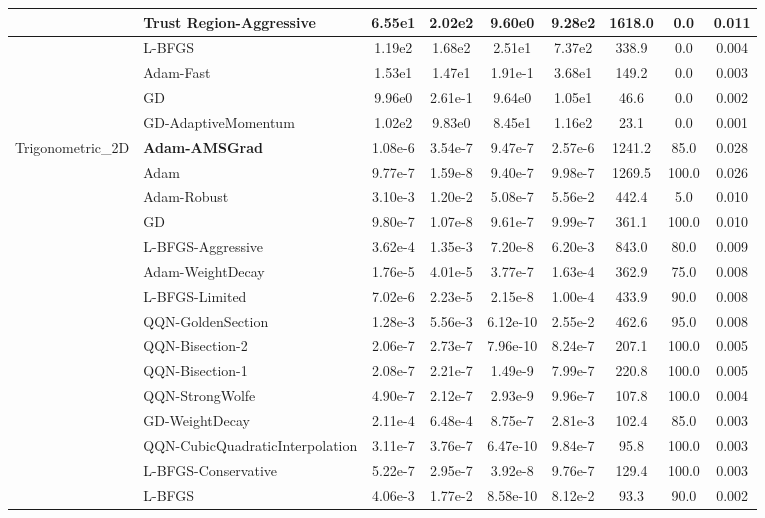 \documentclass[10pt]{article}
\begin{document}
\begin{longtable}{|l|l|c|c|c|c|c|c|c|}
\hline
 & Trust Region-Aggressive & 6.55e1 & 2.02e2 & 9.60e0 & 9.28e2 & 1618.0 & 0.0 & 0.011 \\
\hline
 & L-BFGS & 1.19e2 & 1.68e2 & 2.51e1 & 7.37e2 & 338.9 & 0.0 & 0.004 \\
\hline
 & Adam-Fast & 1.53e1 & 1.47e1 & 1.91e-1 & 3.68e1 & 149.2 & 0.0 & 0.003 \\
\hline
 & GD & 9.96e0 & 2.61e-1 & 9.64e0 & 1.05e1 & 46.6 & 0.0 & 0.002 \\
\hline
 & GD-AdaptiveMomentum & 1.02e2 & 9.83e0 & 8.45e1 & 1.16e2 & 23.1 & 0.0 & 0.001 \\
Trigonometric\_2D & \textbf{Adam-AMSGrad} & 1.08e-6 & 3.54e-7 & 9.47e-7 & 2.57e-6 & 1241.2 & 85.0 & 0.028 \\
\hline
 & Adam & 9.77e-7 & 1.59e-8 & 9.40e-7 & 9.98e-7 & 1269.5 & 100.0 & 0.026 \\
\hline
 & Adam-Robust & 3.10e-3 & 1.20e-2 & 5.08e-7 & 5.56e-2 & 442.4 & 5.0 & 0.010 \\
\hline
 & GD & 9.80e-7 & 1.07e-8 & 9.61e-7 & 9.99e-7 & 361.1 & 100.0 & 0.010 \\
\hline
 & L-BFGS-Aggressive & 3.62e-4 & 1.35e-3 & 7.20e-8 & 6.20e-3 & 843.0 & 80.0 & 0.009 \\
\hline
 & Adam-WeightDecay & 1.76e-5 & 4.01e-5 & 3.77e-7 & 1.63e-4 & 362.9 & 75.0 & 0.008 \\
\hline
 & L-BFGS-Limited & 7.02e-6 & 2.23e-5 & 2.15e-8 & 1.00e-4 & 433.9 & 90.0 & 0.008 \\
\hline
 & QQN-GoldenSection & 1.28e-3 & 5.56e-3 & 6.12e-10 & 2.55e-2 & 462.6 & 95.0 & 0.008 \\
\hline
 & QQN-Bisection-2 & 2.06e-7 & 2.73e-7 & 7.96e-10 & 8.24e-7 & 207.1 & 100.0 & 0.005 \\
\hline
 & QQN-Bisection-1 & 2.08e-7 & 2.21e-7 & 1.49e-9 & 7.99e-7 & 220.8 & 100.0 & 0.005 \\
\hline
 & QQN-StrongWolfe & 4.90e-7 & 2.12e-7 & 2.93e-9 & 9.96e-7 & 107.8 & 100.0 & 0.004 \\
\hline
 & GD-WeightDecay & 2.11e-4 & 6.48e-4 & 8.75e-7 & 2.81e-3 & 102.4 & 85.0 & 0.003 \\
\hline
 & QQN-CubicQuadraticInterpolation & 3.11e-7 & 3.76e-7 & 6.47e-10 & 9.84e-7 & 95.8 & 100.0 & 0.003 \\
\hline
 & L-BFGS-Conservative & 5.22e-7 & 2.95e-7 & 3.92e-8 & 9.76e-7 & 129.4 & 100.0 & 0.003 \\
\hline
 & L-BFGS & 4.06e-3 & 1.77e-2 & 8.58e-10 & 8.12e-2 & 93.3 & 90.0 & 0.002 \\

\end{longtable}
\end{document}
